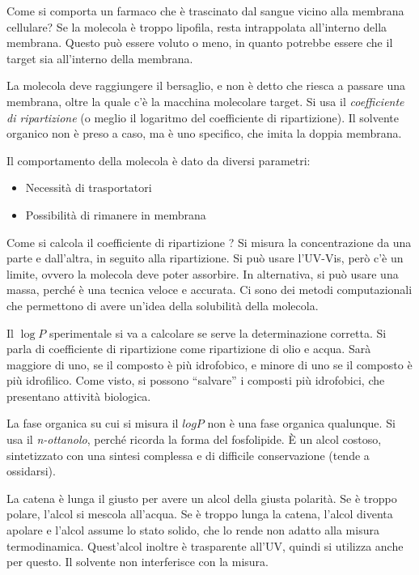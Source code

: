 Come si comporta un farmaco che è trascinato dal sangue vicino alla
membrana cellulare?
Se la molecola è troppo lipofila, resta intrappolata all'interno della
membrana. Questo può essere voluto o meno, in quanto potrebbe essere che
il target sia all'interno della membrana.


La molecola deve raggiungere il bersaglio, e non è detto che riesca a
passare una membrana, oltre la quale c'è la macchina molecolare target.
Si usa il \emph{coefficiente di ripartizione} (o meglio il logaritmo del
coefficiente di ripartizione).
Il solvente organico non è preso a caso, ma è uno specifico, che imita
la doppia membrana.

Il comportamento della molecola è dato da diversi parametri:
\begin{itemize}
\item
  Necessità di trasportatori
\item
  Possibilità di rimanere in membrana
\end{itemize}

Come si calcola il coefficiente di ripartizione ?
Si misura la concentrazione da una parte e dall'altra, in seguito alla
ripartizione. Si può usare l'UV-Vis, però c'è un limite, ovvero la
molecola deve poter assorbire.
In alternativa, si può usare una massa, perché è una tecnica veloce e
accurata.
Ci sono dei metodi computazionali che permettono di avere un'idea della
solubilità della molecola.

Il \(\log P\) sperimentale si va a calcolare se serve la determinazione
corretta.
Si parla di coefficiente di ripartizione come ripartizione di olio e
acqua. Sarà maggiore di uno, se il composto è più idrofobico, e minore
di uno se il composto è più idrofilico.
Come visto, si possono ``salvare'' i composti più idrofobici, che
presentano attività biologica.


La fase organica su cui si misura il \(log P\) non è una fase organica
qualunque. Si usa il \emph{n-ottanolo}, perché ricorda la forma del
fosfolipide. È un alcol costoso, sintetizzato con una sintesi complessa
e di difficile conservazione (tende a ossidarsi).

La catena è lunga il giusto per avere un alcol della giusta polarità. Se
è troppo polare, l'alcol si mescola all'acqua. Se è troppo lunga la
catena, l'alcol diventa apolare e l'alcol assume lo stato solido, che lo
rende non adatto alla misura termodinamica.
Quest'alcol inoltre è trasparente all'UV, quindi si utilizza anche per
questo. Il solvente non interferisce con la misura.

